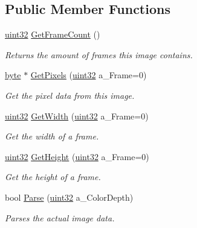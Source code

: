 \subsection*{Public Member Functions}
\begin{DoxyCompactItemize}
\item 
\hyperlink{namespacetil_a20db61688ed403d11f057a508d87e54c}{uint32} \hyperlink{classtil_1_1_image_d_d_s_a616b077809ea2a4ebde9fa53651c198a}{GetFrameCount} ()
\begin{DoxyCompactList}\small\item\em Returns the amount of frames this image contains. \item\end{DoxyCompactList}\item 
\hyperlink{namespacetil_a5f3ec10aca1a788b495a0bd3787bc2dc}{byte} $\ast$ \hyperlink{classtil_1_1_image_d_d_s_ac14aad199b3430d527610f38498faa9e}{GetPixels} (\hyperlink{namespacetil_a20db61688ed403d11f057a508d87e54c}{uint32} a\_\-Frame=0)
\begin{DoxyCompactList}\small\item\em Get the pixel data from this image. \item\end{DoxyCompactList}\item 
\hyperlink{namespacetil_a20db61688ed403d11f057a508d87e54c}{uint32} \hyperlink{classtil_1_1_image_d_d_s_adde03a6b7297091d566c20ae2e24d35d}{GetWidth} (\hyperlink{namespacetil_a20db61688ed403d11f057a508d87e54c}{uint32} a\_\-Frame=0)
\begin{DoxyCompactList}\small\item\em Get the width of a frame. \item\end{DoxyCompactList}\item 
\hyperlink{namespacetil_a20db61688ed403d11f057a508d87e54c}{uint32} \hyperlink{classtil_1_1_image_d_d_s_a9ae6dc6b71a3a056eecd8b756d9089e8}{GetHeight} (\hyperlink{namespacetil_a20db61688ed403d11f057a508d87e54c}{uint32} a\_\-Frame=0)
\begin{DoxyCompactList}\small\item\em Get the height of a frame. \item\end{DoxyCompactList}\item 
bool \hyperlink{classtil_1_1_image_d_d_s_a65def4c46d0da0c6600310c3dcb86cef}{Parse} (\hyperlink{namespacetil_a20db61688ed403d11f057a508d87e54c}{uint32} a\_\-ColorDepth)
\begin{DoxyCompactList}\small\item\em Parses the actual image data. \item\end{DoxyCompactList}\end{DoxyCompactItemize}


